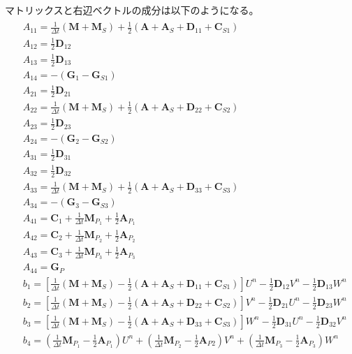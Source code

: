 マトリックスと右辺ベクトルの成分は以下のようになる。
\begin{equation}
	\begin{gathered}
		\begin{aligned} 
			&A_{11} = \frac{1}{\Delta t}\left(\bm{M}+\bm{M}_S\right)+\frac{1}{2}\left(\bm{A}+\bm{A}_S+\bm{D}_{11}+\bm{C}_{S1}\right) \\ 
			&A_{12} = \frac{1}{2} \bm{D}_{12} \\ 
			&A_{13} = \frac{1}{2} \bm{D}_{13} \\
			&A_{14} = -\left(\bm{G}_1-\bm{G}_{S 1}\right) \\
			&A_{21} = \frac{1}{2} \bm{D}_{21} \\ 
			&A_{22} = \frac{1}{\Delta t}\left(\bm{M}+\bm{M}_S\right)+\frac{1}{2}\left(\bm{A}+\bm{A}_S+\bm{D}_{22}+\bm{C}_{S2}\right) \\
			&A_{23} = \frac{1}{2} \bm{D}_{23} \\ 
			&A_{24} = -\left(\bm{G}_2-\bm{G}_{S 2}\right) \\
			&A_{31} = \frac{1}{2} \bm{D}_{31} \\
			&A_{32} = \frac{1}{2} \bm{D}_{32} \\
			&A_{33} = \frac{1}{\Delta t}\left(\bm{M}+\bm{M}_S\right)+\frac{1}{2}\left(\bm{A}+\bm{A}_S+\bm{D}_{33}+\bm{C}_{S3}\right) \\
			&A_{34} = -\left(\bm{G}_3-\bm{G}_{S 3}\right) \\
			&A_{41} = \bm{C}_1+\frac{1}{\Delta t} \bm{M}_{P_1}+\frac{1}{2} \bm{A}_{P_1} \\ 
			&A_{42} = \bm{C}_2+\frac{1}{\Delta t} \bm{M}_{P_2}+\frac{1}{2} \bm{A}_{P_2} \\ 
			&A_{43} = \bm{C}_3+\frac{1}{\Delta t} \bm{M}_{P_3}+\frac{1}{2} \bm{A}_{P_3} \\ 
			&A_{44} = \bm{G}_P \\ 
			&b_1 = \left[\frac{1}{\Delta t}\left(\bm{M}+\bm{M}_S\right)-\frac{1}{2}\left(\bm{A}+\bm{A}_S+\bm{D}_{11}+\bm{C}_{S1}\right)\right] U^n - \frac{1}{2} \bm{D}_{12} V^n - \frac{1}{2} \bm{D}_{13} W^n\\
			&b_2 = \left[\frac{1}{\Delta t}\left(\bm{M}+\bm{M}_S\right)-\frac{1}{2}\left(\bm{A}+\bm{A}_S+\bm{D}_{22}+\bm{C}_{S2}\right)\right] V^n - \frac{1}{2} \bm{D}_{21} U^n - \frac{1}{2} \bm{D}_{23} W^n\\ 
			&b_3 = \left[\frac{1}{\Delta t}\left(\bm{M}+\bm{M}_S\right)-\frac{1}{2}\left(\bm{A}+\bm{A}_S+\bm{D}_{33}+\bm{C}_{S3}\right)\right] W^n - \frac{1}{2} \bm{D}_{31} U^n - \frac{1}{2} \bm{D}_{32} V^n\\ 
			&b_4 = \left(\frac{1}{\Delta t} \bm{M}_{P_1} - \frac{1}{2} \bm{A}_{P_1}\right) U^n
			      +\left(\frac{1}{\Delta t} \bm{M}_{P_2} - \frac{1}{2} \bm{A}_{P 2}\right) V^n
			      +\left(\frac{1}{\Delta t} \bm{M}_{P_3} - \frac{1}{2} \bm{A}_{P_3}\right) W^n
		\end{aligned}
	\end{gathered}
\end{equation}


